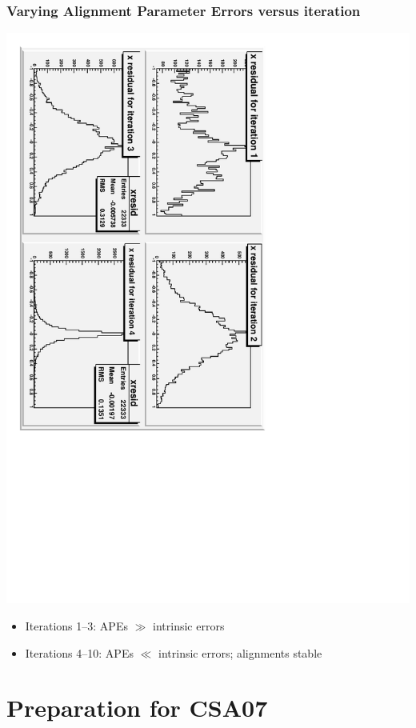 \documentclass[compress]{beamer}
\begin{document}
\begin{frame}
\frametitle{Varying Alignment Parameter Errors versus iteration}
\begin{center}
\includegraphics[height=0.8\linewidth, angle=90]{residuals_by_iteration.pdf}
\end{center}
\begin{itemize}
\item Iterations 1--3: APEs $\gg$ intrinsic errors
\item Iterations 4--10: APEs $\ll$ intrinsic errors; alignments stable
\end{itemize}
\end{frame}

\section*{Preparation for CSA07}
\end{document}
